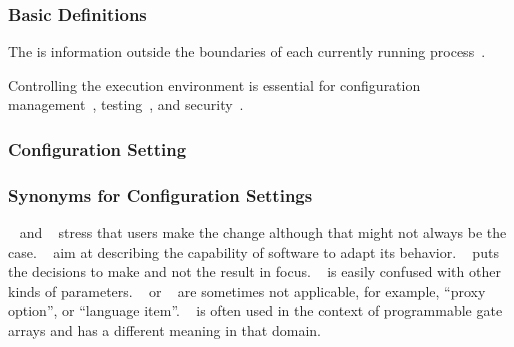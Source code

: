 \documentclass{beamer}
\begin{document}
\begin{frame}
	\frametitle{Basic Definitions}
	The  is information outside the boundaries of each currently running process~\cite{corbato1971multics}.

	Controlling the execution environment is essential for configuration management~\cite{cons2002pan,huang2015confvalley}, testing~\cite{van2010automating,wang2009context}, and security~\cite{goldberg1996secure,schreuders2012towards,perkins2009automatically,liang2003isolated}.
\end{frame}

\begin{frame}
	\frametitle{Configuration Setting}
	
\end{frame}


\begin{frame}[fragile]
	\frametitle{Synonyms for Configuration Settings}
~\cite{jin2014configurations} and ~\cite{anderson2002researching} stress that users make the change although that might not always be the case.
~\cite{gunther2012software,rhein2016variability,villela2014survey,van2001notion,nadi2014mining,mens2016taxonomy} aim at describing the capability of software to adapt its behavior.
~\cite{software1993reuse,czarnecki2012cool} puts the decisions to make and not the result in focus.
~\cite{yin2011empirical,anderson1994towards} is easily confused with other kinds of parameters.
~\cite{anthony2009context} or ~\cite{rabkin2011static,zhang2013automated,zhang2014configuration} are sometimes not applicable, for example, ``proxy option'', or ``language item''.
~\cite{huang2015confvalley} is often used in the context of programmable gate arrays and has a different meaning in that domain.
\end{frame}
\end{document}
